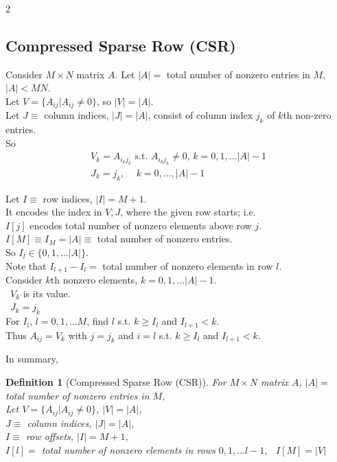 \documentclass[10pt]{amsart}
\newtheorem{definition}{Definition}
\begin{document}
\begin{multicols*}{2}
\subsection{Compressed Sparse Row (CSR)}

Consider $M\times N$ matrix $A$. Let $|A| = $ total number of nonzero entries in $M$, $|A| < MN$. \\

Let $V = \lbrace A_{ij} | A_{ij} \neq 0 \rbrace$, so $|V| = |A|$. \\

Let $J \equiv $ column indices, $|J| = |A|$, consist of column index $j_k$ of $k$th non-zero entries. \\

So 
\[
\begin{gathered}
V_k = A_{i_k j_k} \text{ s.t. } A_{i_k j_k } \neq 0, \, k= 0 , 1, \dots |A| -1 \\
J_k = j_k, \quad \, k = 0, \dots, |A| - 1
\end{gathered}
\]

Let $I \equiv $ row indices, $|I| = M + 1$. \\
\phantom{Let } It encodes the index in $V,J$, where the given row starts; i.e. \\
\phantom{Let It } $I[j]$ encodes total number of nonzero elements above row $j$. \\
\phantom{Let It } $I[M] \equiv I_M = |A| \equiv $ total number of nonzero entries.  \\

So $I_l \in \lbrace 0, 1 , \dots |A| \rbrace$. \\

Note that $I_{l + 1} - I_l = $ total number of nonzero elements in row $l$. \\

Consider $k$th nonzero elements, $k=0,1, \dots |A| - 1$. \\
\quad \, $V_k$ is its value. \\
\quad \, $J_k = j_k$ \\

For $I_l$, $l=0,1, \dots M$, find $l$ s.t. $k\geq I_l $ and $I_{l+1} < k$. \\

Thus $A_{ij} = V_k$ with $j=j_k$ and $i = l$ s.t. $k\geq I_l$ and $I_{l+1} < k$.

In summary,

\begin{definition}[Compressed Sparse Row (CSR)]
	For $M\times N $ matrix $A$, $|A| = $ total number of nonzero entries in $M$, \\
	Let $V = \lbrace A_{ij} | A_{ij} \neq 0 \rbrace$, $|V| = |A|$, \\
	$J \equiv $ column indices, $|J| = |A|$, \\
	$I \equiv $ row offsets, $|I| = M + 1$, \\
	$I[l] =$ total number of nonzero elements in rows $0,1, \dots l - 1$, \quad \, $I[M] = |V|$ \\
	

\end{definition}
\end{multicols*}
\end{document}
